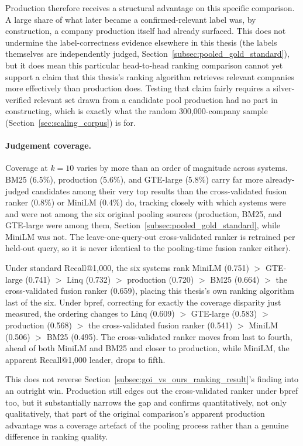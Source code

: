 \documentclass[a4paper,oneside,bibliography=totoc]{scrbook}
\begin{document}
Production therefore receives a structural advantage on this specific comparison. A large share of what later became a confirmed-relevant label was, by construction, a company production itself had already surfaced. This does not undermine the label-correctness evidence elsewhere in this thesis (the labels themselves are independently judged, Section~\ref{subsec:pooled_gold_standard}), but it does mean this particular head-to-head ranking comparison cannot yet support a claim that this thesis's ranking algorithm retrieves relevant companies more effectively than production does. Testing that claim fairly requires a silver-verified relevant set drawn from a candidate pool production had no part in constructing, which is exactly what the random 300{,}000-company sample (Section~\ref{sec:scaling_corpus}) is for.

\paragraph{Judgement coverage.}
\label{subsec:label_coverage_bpref_result}

Coverage at $k=10$ varies by more than an order of magnitude across systems. BM25 (6.5\%), production (5.6\%), and GTE-large (5.8\%) carry far more already-judged candidates among their very top results than the cross-validated fusion ranker (0.8\%) or MiniLM (0.4\%) do, tracking closely with which systems were and were not among the six original pooling sources (production, BM25, and GTE-large were among them, Section~\ref{subsec:pooled_gold_standard}, while MiniLM was not. The leave-one-query-out cross-validated ranker is retrained per held-out query, so it is never identical to the pooling-time fusion ranker either).

Under standard Recall@1{,}000, the six systems rank MiniLM (0.751) $>$ GTE-large (0.741) $>$ Linq (0.732) $>$ production (0.720) $>$ BM25 (0.664) $>$ the cross-validated fusion ranker (0.659), placing this thesis's own ranking algorithm last of the six. Under bpref, correcting for exactly the coverage disparity just measured, the ordering changes to Linq (0.609) $>$ GTE-large (0.583) $>$ production (0.568) $>$ the cross-validated fusion ranker (0.541) $>$ MiniLM (0.506) $>$ BM25 (0.495). The cross-validated ranker moves from last to fourth, ahead of both MiniLM and BM25 and closer to production, while MiniLM, the apparent Recall@1{,}000 leader, drops to fifth.

This does not reverse Section~\ref{subsec:goi_vs_ours_ranking_result}'s finding into an outright win. Production still edges out the cross-validated ranker under bpref too, but it substantially narrows the gap and confirms quantitatively, not only qualitatively, that part of the original comparison's apparent production advantage was a coverage artefact of the pooling process rather than a genuine difference in ranking quality.
\end{document}
